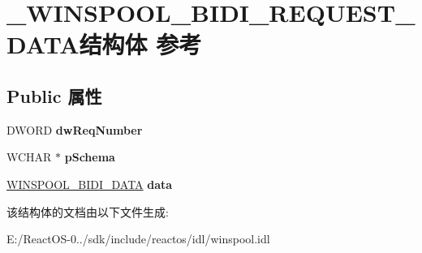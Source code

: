 \hypertarget{struct___w_i_n_s_p_o_o_l___b_i_d_i___r_e_q_u_e_s_t___d_a_t_a}{}\section{\+\_\+\+W\+I\+N\+S\+P\+O\+O\+L\+\_\+\+B\+I\+D\+I\+\_\+\+R\+E\+Q\+U\+E\+S\+T\+\_\+\+D\+A\+T\+A结构体 参考}
\label{struct___w_i_n_s_p_o_o_l___b_i_d_i___r_e_q_u_e_s_t___d_a_t_a}
\subsection*{Public 属性}
\begin{DoxyCompactItemize}
\item 
\mbox{\label{struct___w_i_n_s_p_o_o_l___b_i_d_i___r_e_q_u_e_s_t___d_a_t_a_a882d6de8b189835a48b91c66429d22b7}} 
D\+W\+O\+RD {\bfseries dw\+Req\+Number}
\item 
\mbox{\label{struct___w_i_n_s_p_o_o_l___b_i_d_i___r_e_q_u_e_s_t___d_a_t_a_a8befe8f01b1fb1c0bd0f5db0175aa526}} 
W\+C\+H\+AR $\ast$ {\bfseries p\+Schema}
\item 
\mbox{\label{struct___w_i_n_s_p_o_o_l___b_i_d_i___r_e_q_u_e_s_t___d_a_t_a_a835505cf1b6d0798496ce367ca445b28}} 
\hyperlink{struct___w_i_n_s_p_o_o_l___b_i_d_i___d_a_t_a}{W\+I\+N\+S\+P\+O\+O\+L\+\_\+\+B\+I\+D\+I\+\_\+\+D\+A\+TA} {\bfseries data}
\end{DoxyCompactItemize}


该结构体的文档由以下文件生成\+:\begin{DoxyCompactItemize}
\item 
E\+:/\+React\+O\+S-\/0../sdk/include/reactos/idl/winspool.\+idl\end{DoxyCompactItemize}
